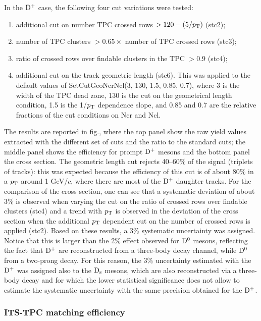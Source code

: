 In the ${\rm D^+}$ case, the following four cut variations were tested:
\begin{enumerate}
\item additional cut on number TPC crossed rows $> 120-(5/p_{\rm T})$ (stc2);
\item number of TPC clusters $>0.65 \times$ number of TPC crossed rows (stc3);
\item ratio of crossed rows over findable clusters in the TPC $>0.9$ (stc4);
\item additional cut on the track geometric length (stc6). This was applied to 
the default values of SetCutGeoNcrNcl(3, 130, 1.5, 0.85, 0.7), where 3 is the 
width of the TPC dead zone, 130 is the cut on the geometrical length condition, 
1.5 is the 1/$p_{\rm T}$ dependence slope, and 0.85 and 0.7 are the relative 
fractions of the cut conditions on Ncr and Ncl.
\end{enumerate}

The results are reported in fig., where the
top panel show the raw yield values extracted with the different set of cuts 
and the ratio to the standard cuts; the middle panel shows the efficiency for 
prompt ${\rm D^+}$ mesons and the bottom panel the cross section.
The geometric length cut rejects 40--60\% of the signal (triplets of tracks):
this was expected because the efficiency of this cut is of about 80\% in a 
$p_{\rm T}$ around 1 GeV/$c$, where there are most of the ${\rm D^+}$ daughter tracks.
For the comparison of the cross section, one can see that a systematic 
deviation of about 3\% is observed when varying the cut on the ratio of 
crossed rows over findable clusters (stc4) and a trend with $p_{\rm T}$ is observed 
in the deviation of the cross section when the additional $p_{\rm T}$ dependent cut 
on the number of crossed rows is applied (stc2).
Based on these results, a 3\% systematic uncertainty was assigned.
Notice that this is larger than the 2\% effect observed for ${\rm D^0}$ mesons,
reflecting the fact that ${\rm D^+}$ are reconstructed from a three-body decay
channel, while ${\rm D^0}$ from a two-prong decay.
For this reason, the 3\% uncertainty estimated with the ${\rm D^+}$ was
assigned also to the ${\rm D_s}$ mesons, which are also reconstructed via a 
three-body decay and for which the lower statistical significance 
does not allow to estimate the systematic uncertainty with the same
precision obtained for the ${\rm D^+}$.

\subsubsection{ITS-TPC matching efficiency}

